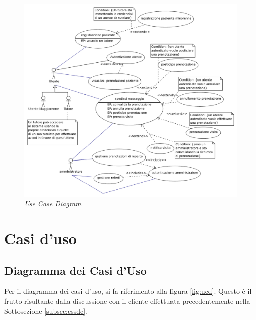 \begin{figure}[t]
\includegraphics[scale=0.63]{svgs/usecase}
\caption{\textit{Use Case Diagram}.}
\label{fig:ucd}
\end{figure}

\section{Casi d'uso}
\subsection{Diagramma dei Casi d'Uso}
Per il diagramma dei casi d'uso, si fa riferimento alla figura \vref{fig:ucd}.
Questo è il frutto risultante dalla discussione con il cliente effettuata 
precedentemente nella Sottosezione \vref{subsec:cssdc}.


